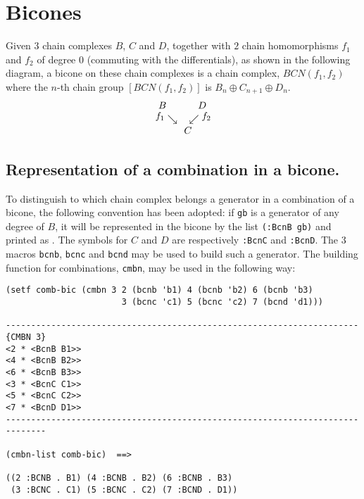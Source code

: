 \newpage

\section {Bicones}

Given $3$ chain complexes $B$, $C$ and $D$, together with $2$
chain homomorphisms $f_1$ and $f_2$ of degree $0$ (commuting with the differentials),
as shown in the following diagram, a bicone on these chain complexes is a chain
complex, $BCN(f_1,f_2)$ where the $n$-th chain group $[BCN(f_1,f_2)]$ is $B_n \oplus C_{n+1} \oplus D_n$.
$$
\begin{array}{l}
\hspace{4pt}B \hspace{32pt} D \\
\hspace{1pt} \raisebox{3pt}{$f_1$} \searrow \hspace{12pt}
             \swarrow \raisebox{3pt}{$f_2$} \\
\hspace{30pt} C
\end{array}
$$


\subsection {Representation of a combination in a bicone.}

To distinguish to which chain complex belongs a generator in a combination of a bicone, the following convention
has been adopted: if {\tt gb} is a generator of any degree of $B$, it will be represented in the bicone
by the list {\tt (:BcnB gb)} and printed as {\tt <BcnB gb>}. The symbols for $C$ and $D$ are respectively
{\tt :BcnC} and {\tt :BcnD}. The $3$ macros {\tt bcnb}, {\tt bcnc} and {\tt bcnd} may be used to build
such a generator. The building function for combinations,  {\tt cmbn}, may be used in the following way:
{\footnotesize\begin{verbatim}
(setf comb-bic (cmbn 3 2 (bcnb 'b1) 4 (bcnb 'b2) 6 (bcnb 'b3)
                       3 (bcnc 'c1) 5 (bcnc 'c2) 7 (bcnd 'd1)))

----------------------------------------------------------------------{CMBN 3}
<2 * <BcnB B1>>
<4 * <BcnB B2>>
<6 * <BcnB B3>>
<3 * <BcnC C1>>
<5 * <BcnC C2>>
<7 * <BcnD D1>>
------------------------------------------------------------------------------

(cmbn-list comb-bic)  ==>

((2 :BCNB . B1) (4 :BCNB . B2) (6 :BCNB . B3)
 (3 :BCNC . C1) (5 :BCNC . C2) (7 :BCND . D1))
\end{verbatim}}

